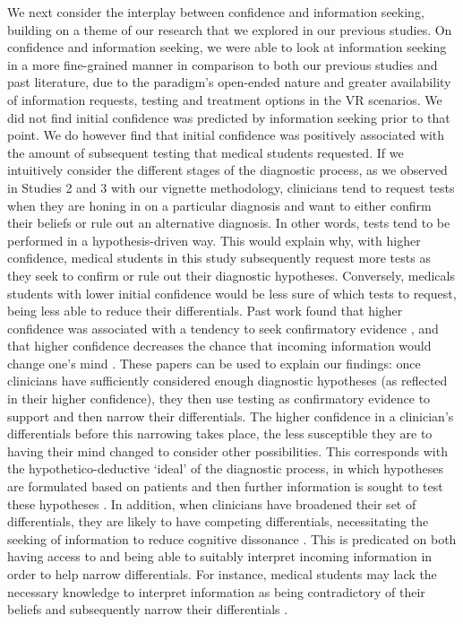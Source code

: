 \documentclass[a4paper, nobind]{templates/ociamthesis}
\begin{document}
We next consider the interplay between confidence and information seeking, building on a theme of our research that we explored in our previous studies. On confidence and information seeking, we were able to look at information seeking in a more fine-grained manner in comparison to both our previous studies and past literature, due to the paradigm's open-ended nature and greater availability of information requests, testing and treatment options in the VR scenarios. We did not find initial confidence was predicted by information seeking prior to that point. We do however find that initial confidence was positively associated with the amount of subsequent testing that medical students requested. If we intuitively consider the different stages of the diagnostic process, as we observed in Studies 2 and 3 with our vignette methodology, clinicians tend to request tests when they are honing in on a particular diagnosis and want to either confirm their beliefs or rule out an alternative diagnosis. In other words, tests tend to be performed in a hypothesis-driven way. This would explain why, with higher confidence, medical students in this study subsequently request more tests as they seek to confirm or rule out their diagnostic hypotheses. Conversely, medicals students with lower initial confidence would be less sure of which tests to request, being less able to reduce their differentials. Past work found that higher confidence was associated with a tendency to seek confirmatory evidence \autocite{rollwage_confidence_2020}, and that higher confidence decreases the chance that incoming information would change one's mind \autocite{pescetelli_confidence_2021}. These papers can be used to explain our findings: once clinicians have sufficiently considered enough diagnostic hypotheses (as reflected in their higher confidence), they then use testing as confirmatory evidence to support and then narrow their differentials. The higher confidence in a clinician's differentials before this narrowing takes place, the less susceptible they are to having their mind changed to consider other possibilities. This corresponds with the hypothetico-deductive `ideal' of the diagnostic process, in which hypotheses are formulated based on patients and then further information is sought to test these hypotheses \autocite{higgs2008}. In addition, when clinicians have broadened their set of differentials, they are likely to have competing differentials, necessitating the seeking of information to reduce cognitive dissonance \autocite{adams_reduction_1961}. This is predicated on both having access to and being able to suitably interpret incoming information in order to help narrow differentials. For instance, medical students may lack the necessary knowledge to interpret information as being contradictory of their beliefs and subsequently narrow their differentials \autocite{arocha_novice_1995}.
\end{document}
